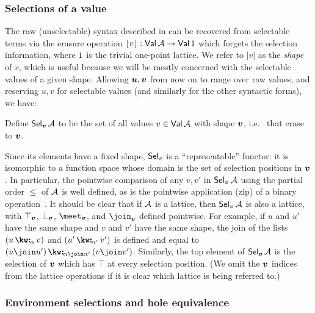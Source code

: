 \subsubsection{Selections of a value}
\label{sec:data-dependencies:selections}

 The raw (unselectable) syntax described in  can be recovered from selectable terms via the erasure operation $\lfloor v\rfloor: \textup{\textsf{Val}}\,{\mathcal{A}} \to \textup{\textsf{Val}}\,{1}$ which forgets the selection information, where $1$ is the trivial one-point lattice. We refer to $|v|$ as the \emph{shape} of $v$, which is useful because we will be mostly concerned with the selectable values of a given shape. Allowing $\bm{u}, \bm{v}$ from now on to range over raw values, and reserving $u, v$ for selectable values (and similarly for the other syntactic forms), we have:

\begin{definition}
   Define $\textup{\textsf{Sel}}_{\bm{v}}\,{\mathcal{A}}$ to be the set of all values $v \in \textup{\textsf{Val}}\,{\mathcal{A}}$ with shape $\bm{v}$, i.e.
   ~that erase to $\bm{v}$.
\end{definition}

Since its elements have a fixed shape, $\textup{\textsf{Sel}}_{v}$ is a ``representable'' functor: it is isomorphic to a function space whose domain is the set of selection positions in $\bm{v}$. In particular, the pointwise comparison of any $v, v'$ in $\textup{\textsf{Sel}}_{\bm{v}}\,{\mathcal{A}}$ using the partial order $\leq$ of $\mathcal{A}$ is well defined, as is the pointwise application (zip) of a binary operation~\cite{gibbons17}. It should be clear that if $\mathcal{A}$ is a lattice, then $\textup{\textsf{Sel}}_{\bm{v}}\,{\mathcal{A}}$ is also a lattice, with $\top_{\bm{v}}$, $\bot_{\bm{v}}$, $\meet_{\raw{v}}$, and $\join_{\raw{v}}$ defined pointwise. For example, if $u$ and $u'$ have the same shape and $v$ and $v'$ have the same shape, the join of the lists $(\annCons{u}{v}{\alpha})$ and $(\annCons{u'}{v'}{\alpha'})$ is defined and equal to $\annCons{(u \join u')}{(v \join v')}{\alpha \join \alpha'}$. Similarly, the top element of $\textup{\textsf{Sel}}_{\bm{v}}\,{\mathcal{A}}$ is the selection of $\bm{v}$ which has $\top$ at every selection position. (We omit the $\bm{v}$ indices from the lattice operations if it is clear which lattice is being referred to.)

\subsubsection{Environment selections and hole equivalence}

